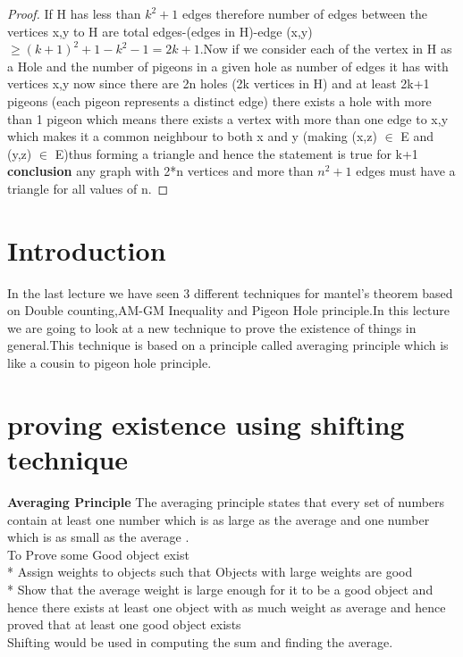 \begin{proof}
If H has less than $k^2+1 $ edges therefore number of edges between the vertices x,y to H are 
total edges-(edges in H)-edge (x,y)$\geq (k+1)^2+1-k^2-1=2k+1$.Now if we consider each of the vertex in H as a Hole and the number of pigeons in a given hole as number of edges it has with vertices x,y  now since there are 2n holes (2k vertices in H) and at least 2k+1 pigeons (each pigeon represents a distinct edge) there exists a hole with more than 1 pigeon which means there exists a vertex with more than one edge to x,y which makes it a common neighbour to both x and y  (making (x,z) $\in$ E and (y,z) $\in$ E)thus forming a triangle and hence the statement is true for k+1
\textbf{conclusion} any graph with 2*n vertices and more than $n^2+1$ edges must have a triangle for all values of n.
\end{proof}


\section{Introduction}
In the last lecture we have seen 3 different techniques for mantel's theorem based on Double counting,AM-GM Inequality and Pigeon Hole principle.In this lecture we are going to look at a new technique to prove the existence of things in general.This technique is based on a principle called averaging principle which is like a cousin to pigeon hole principle.\\

\section{ proving existence using shifting technique}
\textbf{Averaging Principle}
The averaging principle states that every set of numbers contain at least one number which is as large as the average and one number which is as small as the average .\\
To Prove some Good object exist\\
* Assign weights to objects such that Objects with large weights are good\\
* Show that the average weight is large enough for it to be a good object 
and hence there exists at least one object with as much weight as average and hence proved that at least one good object exists\\
Shifting would be used in computing the sum and finding the average.

